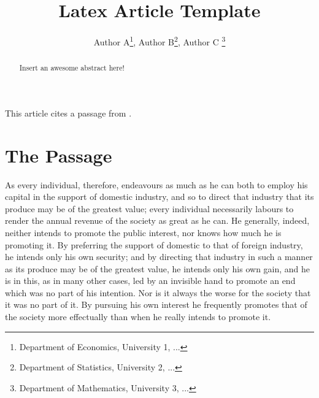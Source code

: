 \documentclass[12 pt,a4paper]{article}
\title{Latex Article Template}
\author{Author A\thanks{Department of Economics, University 1, ...}, Author B\thanks{Department of Statistics, University 2, ...}, Author C \thanks{Department of Mathematics, University 3, ...}}
\begin{document}
\maketitle
\begin{abstract}
Insert an awesome abstract here!    
\end{abstract}

\clearpage

This article cites a passage from \citet{smith1827inquiry}.
 
\section{The Passage}

As every individual, therefore, endeavours as much as he can both to employ his capital in the support of domestic industry, and so to direct that industry that its produce may be of the greatest value; every individual necessarily labours to render the annual revenue of the society as great as he can. He generally, indeed, neither intends to promote the public interest, nor knows how much he is promoting it. By preferring the support of domestic to that of foreign industry, he intends only his own security; and by directing that industry in such a manner as its produce may be of the greatest value, he intends only his own gain, and he is in this, as in many other cases, led by an invisible hand to promote an end which was no part of his intention. Nor is it always the worse for the society that it was no part of it. By pursuing his own interest he frequently promotes that of the society more effectually than when he really intends to promote it.



\end{document}
